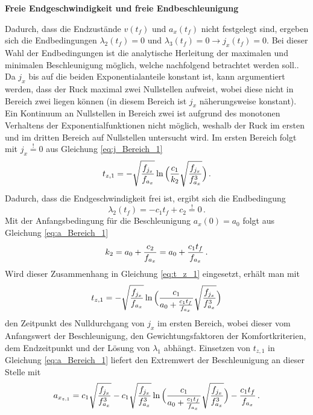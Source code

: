 \textbf{Freie Endgeschwindigkeit und freie Endbeschleunigung}

Dadurch, dass die Endzustände $v(t_f)$ und $a_x(t_f)$ nicht festgelegt sind, ergeben sich die Endbedingungen $\lambda_2(t_f) = 0$ und $\lambda_3(t_f) = 0 \rightarrow j_x(t_f) = 0$. Bei dieser Wahl der Endbedingungen ist die analytische Herleitung der maximalen und minimalen Beschleunigung möglich, welche nachfolgend betrachtet werden soll.. Da $j_x$ bis auf die beiden Exponentialanteile konstant ist, kann argumentiert werden, dass der Ruck maximal zwei Nullstellen aufweist, wobei diese nicht in Bereich zwei liegen können (in diesem Bereich ist $j_x$ näherungsweise konstant). Ein Kontinuum an Nullstellen in Bereich zwei ist aufgrund des monotonen Verhaltens der Exponentialfunktionen nicht möglich, weshalb der Ruck im ersten und im dritten Bereich auf Nullstellen untersucht wird. Im ersten Bereich folgt mit $j_x \stackrel{!}{=} 0$ aus Gleichung \eqref{eq:j_Bereich_1}
\begin{equation}
	t_{z,1} = -\sqrt{\frac{f_{j_x}}{f_{a_x}}}\ln{\Big(\frac{c_1}{k_2}\sqrt{\frac{\ensuremath{f_{j_x}}}{\ensuremath{f_{a_x}}^3}}\Big)}\,. \label{eq:t_z_1}
\end{equation}
Dadurch, dass die Endgeschwindigkeit frei ist, ergibt sich die Endbedingung 
\begin{equation}
	\lambda_2(t_f) = -c_1t_f + c_2 \stackrel{!}{=} 0\,.
\end{equation}
Mit der Anfangsbedingung für die Beschleunigung $a_x(0) = a_0$ folgt aus Gleichung \eqref{eq:a_Bereich_1}
\begin{equation}
k_2 = a_0 + \frac{c_2}{f_{a_x}} = a_0 + \frac{c_1t_f}{f_{a_x}}\,.
\end{equation}
Wird dieser Zusammenhang in Gleichung \eqref{eq:t_z_1} eingesetzt, erhält man mit 
\begin{equation}
t_{z,1} = -\sqrt{\frac{f_{j_x}}{f_{a_x}}}\ln{\Big(\frac{c_1}{a_0+\frac{c_1t_f}{\ensuremath{f_{a_x}}}}\sqrt{\frac{\ensuremath{f_{j_x}}}{\ensuremath{f_{a_x}}^3}}\Big)}
\end{equation}
den Zeitpunkt des Nulldurchgang von $j_x$ im ersten Bereich, wobei dieser vom Anfangswert der Beschleunigung, den Gewichtungsfaktoren der Komfortkriterien, dem Endzeitpunkt und der Lösung von $\lambda_1$ abhängt. Einsetzen von $t_{z,1}$ in Gleichung \eqref{eq:a_Bereich_1} liefert den Extremwert der Beschleunigung an dieser Stelle mit 
\begin{equation}
a_{x_{z,1}} = c_1\sqrt{\frac{f_{j_x}}{f_{a_x}^3}} -c_1\sqrt{\frac{f_{j_x}}{f_{a_x}^3}}\ln{\Big(\frac{c_1}{a_0+\frac{c_1t_f}{\ensuremath{f_{a_x}}}}\sqrt{\frac{\ensuremath{f_{j_x}}}{\ensuremath{f_{a_x}}^3}}\Big)} - \frac{c_1t_f}{f_{a_x}}\,. 
\end{equation}
